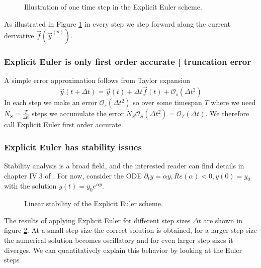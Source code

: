 \begin{figure}[!htb]
  \centering
  \hfill
  \caption{Illustration of one time step in the Explicit Euler scheme.}
  \label{fig:expl_euler_step}
\end{figure}

As illustrated in Figure \ref{fig:expl_euler_step} in every step we step forward along the current derivative $\vec{f} \left( \vec{y}^{(n)} \right)$.

\subsubsection{Explicit Euler is only first order accurate | truncation error}
A simple error approximation follows from Taylor expansion
\[
\vec{y}(t+\Delta t) = \vec{y}(t) + \Delta t \vec{f}(t) + \mathcal O_s(\Delta t^2)
\]
In each step we make an error $\mathcal O_s(\Delta t^2)$ so over some 
timespan $T$ where we need $N_S = \frac{T}{\Delta t}$ steps we accumulate 
the error $N_S \mathcal O_S (\Delta t^2) = \mathcal O_T(\Delta t)$. We therefore 
call Explicit Euler first order accurate.

\subsubsection{Explicit Euler has stability issues}
Stability analysis is a broad field, and the interested reader can find details in chapter IV.3 of \cite{Hairer1996}. For now, consider the ODE $\partial_t y = \alpha y, Re(\alpha) < 0, y(0) = y_0$ with the solution $y(t) = y_0 e^{\alpha y}$.

\begin{figure}[!htb]
  \centering
  \hfill
  \caption{Linear stability of the Explicit Euler scheme.}
  \label{fig:expl_euler_stab}
\end{figure}

The results of applying Explicit Euler for different step sizes $\Delta t$ are shown in figure \ref{fig:expl_euler_stab}. At a small step size the correct solution is obtained, for a larger step size the numerical solution becomes oscillatory and for even larger step sizes it diverges. We can quantitatively explain this behavior by looking at the Euler steps

